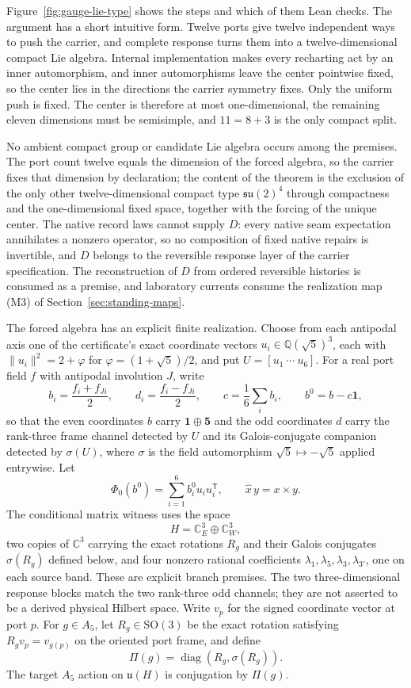 \documentclass[11pt]{article}
\theoremstyle{definition}
\theoremstyle{remark}
\begin{document}
Figure~\ref{fig:gauge-lie-type} shows the steps and which of them Lean checks.
The argument has a short intuitive form. Twelve ports give twelve
independent ways to push the carrier, and complete response turns them into
a twelve-dimensional compact Lie algebra. Internal implementation makes every
recharting act by an inner automorphism, and inner automorphisms leave the
center pointwise fixed, so the center lies in the directions the carrier
symmetry fixes. Only the uniform push is fixed. The center is therefore at
most one-dimensional, the remaining eleven dimensions must be semisimple, and
$11=8+3$ is the only compact split.

No ambient compact group or candidate Lie algebra occurs among the premises.
The port count twelve equals the dimension of the forced algebra, so the
carrier fixes that dimension by declaration; the content of the theorem is
the exclusion of the only other twelve-dimensional compact type
$\mathfrak{su}(2)^4$ through compactness and the one-dimensional fixed space,
together with the forcing of the unique center. The native record laws
cannot supply $D$: every native seam expectation annihilates a nonzero
operator, so no composition of fixed native repairs is invertible, and $D$
belongs to the reversible response layer of the carrier specification. The reconstruction of $D$ from ordered
reversible histories is consumed as a premise, and laboratory currents consume the realization map (M3) of Section~\ref{sec:standing-maps}.

The forced algebra has an explicit finite realization. Choose from each antipodal axis one of the certificate's exact coordinate vectors $u_i\in\mathbb Q(\sqrt5)^3$, each with $\lVert u_i\rVert^2=2+\varphi$ for $\varphi=(1+\sqrt5)/2$, and put $U=[u_1\ \cdots\ u_6]$. For a real port field $f$ with antipodal involution $J$, write
\[
b_i=\frac{f_i+f_{J i}}2,\qquad
d_i=\frac{f_i-f_{J i}}2,\qquad
c=\frac16\sum_i b_i,\qquad b^0=b-c\mathbf1 ,
\]
so that the even coordinates $b$ carry $\mathbf1\oplus\mathbf5$ and the odd coordinates $d$ carry the rank-three frame channel detected by $U$ and its Galois-conjugate companion detected by $\sigma(U)$, where $\sigma$ is the field automorphism $\sqrt5\mapsto-\sqrt5$ applied entrywise. Let
\[
\Phi_0(b^0)=\sum_{i=1}^{6}b_i^0u_iu_i^{\mathsf T},
\qquad
\widehat{x}\,y=x\times y .
\]
The conditional matrix witness uses the space
\[
H=\mathbb C^3_E\oplus\mathbb C^3_W ,
\]
two copies of $\mathbb C^3$ carrying the exact rotations $R_g$ and their Galois conjugates $\sigma(R_g)$ defined below, and four nonzero rational coefficients
$\lambda_1,\lambda_5,\lambda_3,\lambda_{3'}$, one on each source band.
These are explicit branch premises. The two three-dimensional response blocks
match the two rank-three odd channels; they are not asserted to be a derived
physical Hilbert space.
Write $v_p$ for the signed coordinate vector at port $p$. For $g\in A_5$, let
$R_g\in\mathrm{SO}(3)$ be the exact rotation satisfying
$R_gv_p=v_{g(p)}$ on the oriented port frame, and define
\[
\Pi(g)=\operatorname{diag}(R_g,\sigma(R_g)).
\]
The target $A_5$ action on $\mathfrak u(H)$ is conjugation by $\Pi(g)$.
\end{document}
